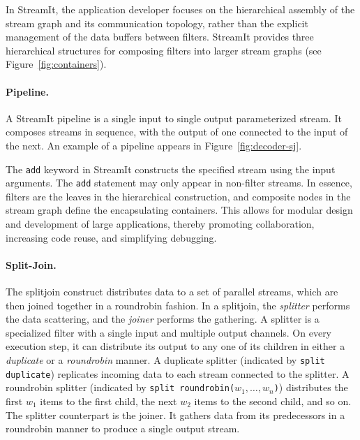 In StreamIt, the application developer focuses on the hierarchical
assembly of the stream graph and its communication topology, rather
than the explicit management of the data buffers between filters.
StreamIt provides three hierarchical structures for composing filters
into larger stream graphs (see Figure~\ref{fig:containers}).

\paragraph{Pipeline.}
A StreamIt pipeline is a single input to single output parameterized
stream. It composes streams in sequence, with the output of one
connected to the input of the next.  An example of a pipeline appears
in Figure~\ref{fig:decoder-sj}.

The {\tt add} keyword in StreamIt constructs the specified stream
using the input arguments. The {\tt add} statement may only appear in
non-filter streams.  In essence, filters are the leaves in the
hierarchical construction, and composite nodes in the stream graph
define the encapsulating containers. This allows for modular design
and development of large applications, thereby  promoting
collaboration, increasing code reuse, and simplifying debugging.

\paragraph{Split-Join.}
The splitjoin construct distributes data to a set of parallel
streams, which are then joined together in a roundrobin fashion. In a
splitjoin, the {\it splitter} performs the data scattering, and the
{\it joiner} performs the gathering. A splitter is a specialized
filter with a single input and multiple output channels. On every
execution step, it can distribute its output to any one of its
children in either a {\it duplicate} or a {\it roundrobin} manner.  A
duplicate splitter (indicated by \texttt{split duplicate}) replicates
incoming data to each stream connected to the splitter.  A
roundrobin splitter (indicated by {\tt split
roundrobin($w_1,\ldots,w_n$)}) distributes the first $w_1$ items to
the first child, the next $w_2$ items to the second child, and so
on.  The splitter counterpart is the joiner. 
It gathers data from its predecessors in a roundrobin manner to
produce a single output stream.

